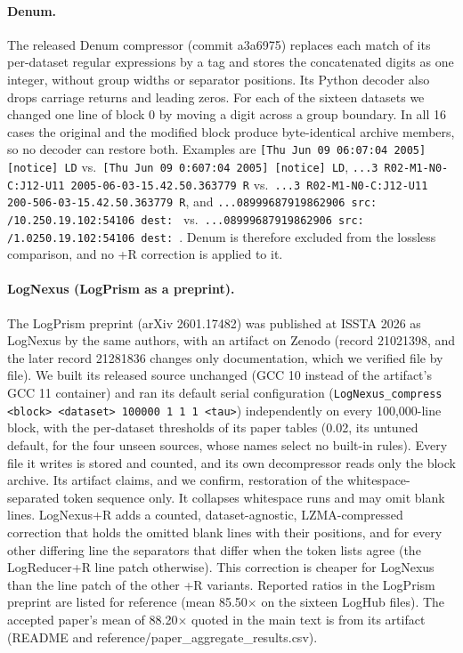 \paragraph{Denum.} The released Denum compressor (commit a3a6975) replaces each match of its per-dataset regular expressions by a tag and stores the concatenated digits as one integer, without group widths or separator positions. Its Python decoder also drops carriage returns and leading zeros. For each of the sixteen datasets we changed one line of block 0 by moving a digit across a group boundary. In all 16 cases the original and the modified block produce byte-identical archive members, so no decoder can restore both. Examples are \texttt{[Thu Jun 09 06:07:04 2005] [notice] LD} vs.\ \texttt{[Thu Jun 09 0:607:04 2005] [notice] LD}, \texttt{...3 R02-M1-N0-C:J12-U11 2005-06-03-15.42.50.363779 R} vs.\ \texttt{...3 R02-M1-N0-C:J12-U11 200-506-03-15.42.50.363779 R}, and \texttt{...08999687919862906 src: /10.250.19.102:54106 dest: } vs.\ \texttt{...08999687919862906 src: /1.0250.19.102:54106 dest: }. Denum is therefore excluded from the lossless comparison, and no +R correction is applied to it.

\paragraph{LogNexus (LogPrism as a preprint).} The LogPrism preprint (arXiv 2601.17482) was published at ISSTA 2026 as LogNexus by the same authors, with an artifact on Zenodo (record 21021398, and the later record 21281836 changes only documentation, which we verified file by file). We built its released source unchanged (GCC 10 instead of the artifact\textquoteright s GCC 11 container) and ran its default serial configuration (\texttt{LogNexus\_compress <block> <dataset> 100000 1 1 1 <tau>}) independently on every 100,000-line block, with the per-dataset thresholds of its paper tables (0.02, its untuned default, for the four unseen sources, whose names select no built-in rules). Every file it writes is stored and counted, and its own decompressor reads only the block archive. Its artifact claims, and we confirm, restoration of the whitespace-separated token sequence only. It collapses whitespace runs and may omit blank lines. LogNexus+R adds a counted, dataset-agnostic, LZMA-compressed correction that holds the omitted blank lines with their positions, and for every other differing line the separators that differ when the token lists agree (the LogReducer+R line patch otherwise). This correction is cheaper for LogNexus than the line patch of the other +R variants. Reported ratios in the LogPrism preprint are listed for reference (mean 85.50$\times$ on the sixteen LogHub files). The accepted paper\textquoteright s mean of 88.20$\times$ quoted in the main text is from its artifact (README and reference/paper\_aggregate\_results.csv).

